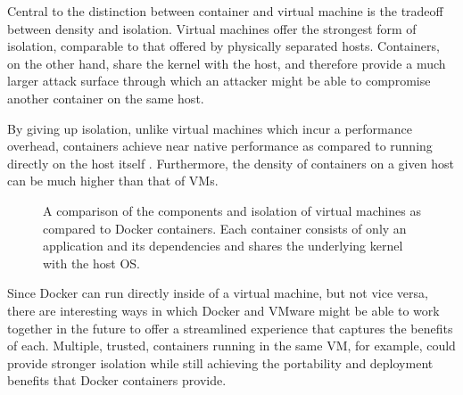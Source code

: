\documentclass[\myfontsize, letterpaper]{article}
\begin{document}
Central to the distinction between container and virtual machine is the tradeoff between density and isolation. Virtual machines offer the strongest form of isolation, comparable to that offered by physically separated hosts. Containers, on the other hand, share the kernel with the host, and therefore provide a much larger attack surface through which an attacker might be able to compromise another container on the same host. 

By giving up isolation, unlike virtual machines which incur a performance overhead, containers achieve near native performance as compared to running directly on the host itself \cite{performance}. Furthermore, the density of containers on a given host can be much higher than that of VMs. 

\begin{figure}[h]
\centering
{}
\quad
\quad
{}
\caption{A comparison of the components and isolation of virtual machines as compared to Docker containers. Each container consists of only an application and its dependencies and shares the underlying kernel with the host OS.}
\label{fig:test}
\end{figure}

Since Docker can run directly inside of a virtual machine, but not vice versa, there are interesting ways in which Docker and VMware might be able to work together in the future to offer a streamlined experience that captures the benefits of each. Multiple, trusted, containers running in the same VM, for example, could provide stronger isolation while still achieving the portability and deployment benefits that Docker containers provide.
\end{document}
